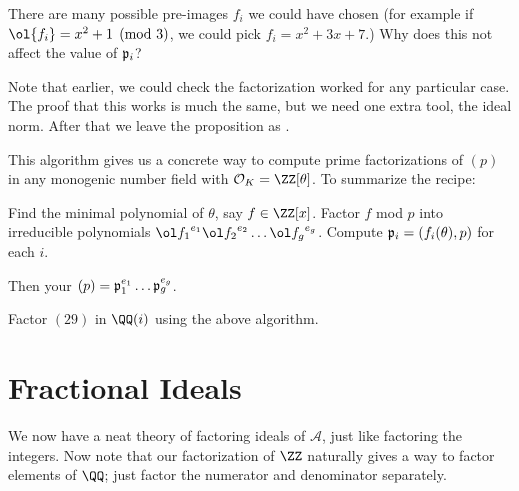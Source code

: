 \begin{ques}
	There are many possible pre-images $f_i$ we could have chosen
	(for example if $\ol{f_i} = x^2+1 \pmod 3$, we could pick $f_i = x^2 + 3x + 7$.)
	Why does this not affect the value of $\mathfrak p_i$?
\end{ques}

Note that earlier, we could check the factorization worked
for any particular case. 
The proof that this works is much the same, but we need one extra tool, the ideal norm.
After that we leave the proposition as .

This algorithm gives us a concrete way to compute prime factorizations of $(p)$
in any monogenic number field with $\OO_K = \ZZ[\theta]$. To summarize the recipe:
\begin{enumerate}
	\ii Find the minimal polynomial of $\theta$, say $f \in \ZZ[x]$.
	\ii Factor $f$ mod $p$ into irreducible polynomials ${\ol f_1}^{e_1} {\ol f_2}^{e_2} \dots {\ol f_g}^{e_g}$.
	\ii Compute $\mathfrak p_i = (f_i(\theta), p)$ for each $i$.
\end{enumerate}
Then your $(p) = \mathfrak p_1^{e_1} \dots \mathfrak p_g^{e_g}$.

\begin{exercise}
	Factor $(29)$ in $\QQ(i)$ using the above algorithm.
\end{exercise}


\section{Fractional Ideals}
We now have a neat theory of factoring ideals of $\mathcal A$,
just like factoring the integers.
Now note that our factorization of $\ZZ$ naturally gives
a way to factor elements of $\QQ$; just factor the numerator and denominator separately.

